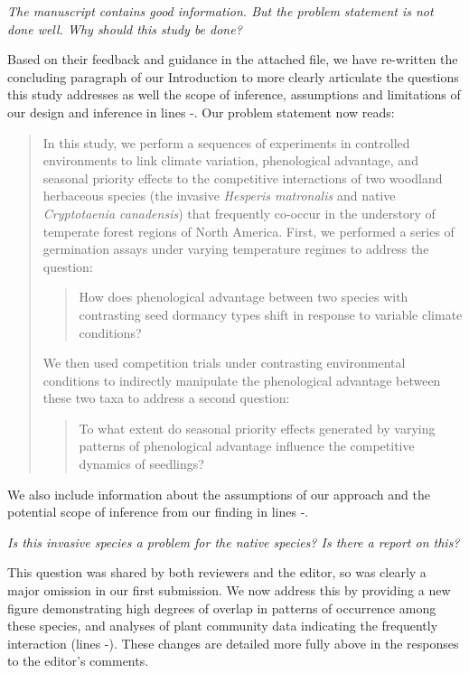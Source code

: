 \documentclass[11pt]{article}
\begin{document}
\emph{The manuscript contains good information. But the problem statement is not done well. Why should this study be done?} 

Based on their feedback and guidance in the attached file, we have re-written the concluding paragraph of our Introduction to more clearly articulate the questions this study addresses as well the scope of inference, assumptions and limitations of our design and inference in lines -. Our problem statement now reads:
\begin{quote}
In this study, we perform a sequences of experiments in controlled environments to link climate variation, phenological advantage, and seasonal priority effects to the competitive interactions of two woodland herbaceous species (the invasive \textit{Hesperis matronalis} and native \textit{Cryptotaenia canadensis}) that frequently co-occur in the understory of temperate forest regions of North America. First, we performed a series of germination assays under varying temperature regimes to address the question: 
\begin{quote}How does phenological advantage between two species with contrasting seed dormancy types shift in response to variable climate conditions?\end{quote}
We then used competition trials under contrasting environmental conditions to indirectly manipulate the phenological advantage between these two taxa to address a second question: \begin{quote}To what extent do seasonal priority effects generated by varying patterns of phenological advantage influence the competitive dynamics of seedlings?\end{quote}
\end{quote}

We also include information about the assumptions of our approach and the potential scope of inference from our finding in lines -. 

\emph{Is this invasive species a problem for the native species? Is there a report on this?}

This question was shared by both reviewers and the editor, so was clearly a major omission in our first submission. We now address this by providing a new figure demonstrating high degrees of overlap in patterns of occurrence among these species, and analyses of plant community data indicating the frequently interaction (lines -). These changes are detailed more fully above in the responses to the editor's comments.
\end{document}
